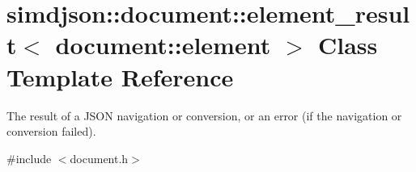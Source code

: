 \hypertarget{classsimdjson_1_1document_1_1element__result_3_01document_1_1element_01_4}{}\section{simdjson\+:\+:document\+:\+:element\+\_\+result$<$ document\+:\+:element $>$ Class Template Reference}
\label{classsimdjson_1_1document_1_1element__result_3_01document_1_1element_01_4}


The result of a J\+S\+ON navigation or conversion, or an error (if the navigation or conversion failed).  




{\ttfamily \#include $<$document.\+h$>$}

